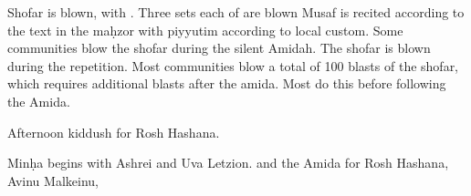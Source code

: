 {Shofar is blown, with . Three sets each of  are blown  Musaf is recited according to the text in the ma\d{h}zor with piyyutim according to local custom. Some communities blow the shofar during the silent Amidah.  The shofar is blown during the repetition.  Most communities blow a total of 100 blasts of the shofar, which requires additional blasts after the amida.  Most do this before  following the Amida.

Afternoon kiddush for Rosh Hashana.

Min\d{h}a begins with Ashrei and Uva Letzion. \halfkad and the Amida for Rosh Hashana, Avinu Malkeinu, \fullkad

}

\newcommand{\tishreiShab}{
\roshhashanashabbat
}